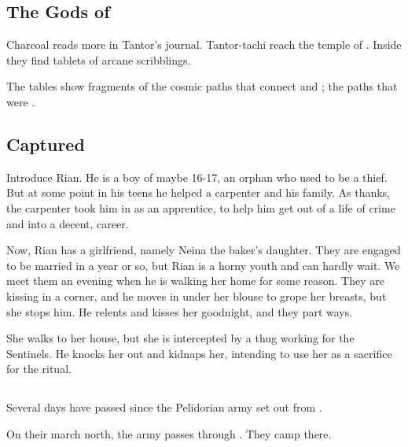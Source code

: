 \subsection{The Gods of \EreshKal}
Charcoal reads more in Tantor's journal. Tantor-tachi reach the temple of \Rungertemple. Inside they find tablets of arcane scribblings. 

The tables show fragments of the cosmic paths that connect \Miith{} and \Machai; the paths that were . 









\subsection{Captured}
Introduce Rian. He is a \Malcurian boy of maybe 16-17, an orphan who used to be a thief. But at some point in his teens he helped a carpenter and his family. As thanks, the carpenter took him in as an apprentice, to help him get out of a life of crime and into a decent, \honourable career. 

Now, Rian has a girlfriend, namely Neina the baker's daughter. They are engaged to be married in a year or so, but Rian is a horny youth and can hardly wait. We meet them an evening when he is walking her home for some reason. They are kissing in a corner, and he moves in under her blouse to grope her breasts, but she stops him. He relents and kisses her goodnight, and they part ways. 

She walks to her house, but she is intercepted by a thug working for the Sentinels. He knocks her out and kidnaps her, intending to use her as a sacrifice for the \Nithdornazsh{} ritual. 







\subsection{\Forclin}
Several days have passed since the Pelidorian army set out from \Malcur. 

On their march north, the army passes through \Forclin. They camp there. 





